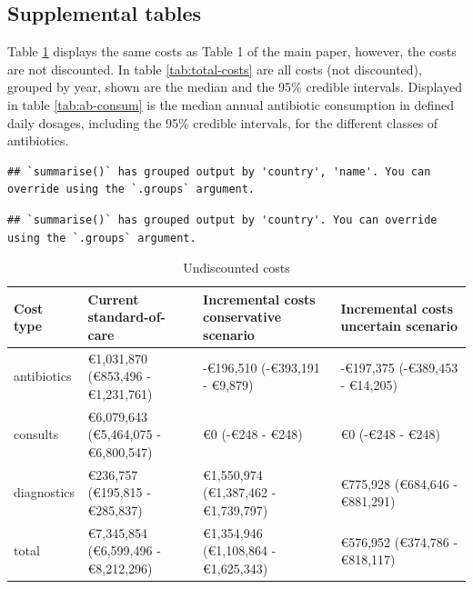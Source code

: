 \documentclass[
]{article}
\begin{document}
\hypertarget{supplemental-tables}{%
\subsection{Supplemental tables}\label{supplemental-tables}}

Table \ref{tab:undiscounted-costs} displays the same costs as Table 1 of the main paper, however, the costs are not discounted. In table \ref{tab:total-costs} are all costs (not discounted), grouped by year, shown are the median and the 95\% credible intervals. Displayed in table \ref{tab:ab-consum} is the median annual antibiotic consumption in defined daily dosages, including the 95\% credible intervals, for the different classes of antibiotics.

\begin{verbatim}
## `summarise()` has grouped output by 'country', 'name'. You can override using the `.groups` argument.
\end{verbatim}

\begin{verbatim}
## `summarise()` has grouped output by 'country'. You can override using the `.groups` argument.
\end{verbatim}

\begingroup\fontsize{7}{9}\selectfont

\begin{longtable}[t]{llll}
\caption{\label{tab:undiscounted-costs}Undiscounted costs}\\
\toprule
Cost type & Current standard-of-care & Incremental costs conservative scenario & Incremental costs uncertain scenario\\
\midrule
antibiotics & €1,031,870 (€853,496 - €1,231,761) & -€196,510 (-€393,191 - €9,879) & -€197,375 (-€389,453 - €14,205)\\
consults & €6,079,643 (€5,464,075 - €6,800,547) & €0 (-€248 - €248) & €0 (-€248 - €248)\\
diagnostics & €236,757 (€195,815 - €285,837) & €1,550,974 (€1,387,462 - €1,739,797) & €775,928 (€684,646 - €881,291)\\
total & €7,345,854 (€6,599,496 - €8,212,296) & €1,354,946 (€1,108,864 - €1,625,343) & €576,952 (€374,786 - €818,117)\\
\bottomrule
\end{longtable}
\endgroup{}
\end{document}
